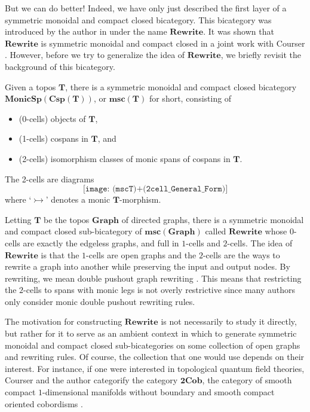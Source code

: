 \documentclass[11pt]{amsart}
\newcommand{\cat}[1]{\mathbf{#1}}
\newcommand{\bimonspcsp}[1]{\mathbf{MonicSp(Csp(#1))}}
\theoremstyle{remark}
\theoremstyle{definition}
\begin{document}
But we can do better! Indeed, we have only just described the first layer of a symmetric monoidal and compact closed bicategory. This bicategory was introduced by the author in \cite{Cic} under the name $\cat{Rewrite}$. It was shown that $\cat{Rewrite}$ is symmetric monoidal and compact closed in a joint work with Courser \cite{CicCours}. However, before we try to generalize the idea of $\cat{Rewrite}$, we briefly revisit the background of this bicategory. 

Given a topos $\cat{T}$, there is a symmetric monoidal and compact closed bicategory $\bimonspcsp{T}$, or $\cat{msc}(\cat{T})$ for short, consisting of 
\begin{itemize}
	\item (0-cells) objects of $\cat{T}$,
	\item (1-cells) cospans in $\cat{T}$, and
	\item (2-cells) isomorphism classes of monic spans of cospans in $\cat{T}$.
\end{itemize} 
The 2-cells are diagrams 
\[
	\texttt{[image: (mscT)+(2cell\_General\_Form)]}
\] 
where `$\rightarrowtail$' denotes a monic $\cat{T}$-morphism.  

Letting $\cat{T}$ be the topos $\cat{Graph}$ of directed graphs, there is a symmetric monoidal and compact closed sub-bicategory of $\cat{msc}(\cat{Graph})$ called $\cat{Rewrite}$ whose $0$-cells are exactly the edgeless graphs, and full in $1$-cells and $2$-cells. The idea of $\cat{Rewrite}$ is that the $1$-cells are open graphs and the $2$-cells are the ways to rewrite a graph into another while preserving the input and output nodes. By rewriting, we mean double pushout graph rewriting \cite{Corr_AlgAppGraphTrans}. This means that restricting the $2$-cells to spans with monic legs is not overly restrictive since many authors only consider monic double pushout rewriting rules.  

The motivation for constructing $\cat{Rewrite}$ is not necessarily to study it directly, but rather for it to serve as an ambient context in which to generate symmetric monoidal and compact closed sub-bicategories on some collection of open graphs and rewriting rules. Of course, the collection that one would use depends on their interest. For instance, if one were interested in topological quantum field theories, Courser and the author categorify the category $\cat{2Cob}$, the category of smooth compact $1$-dimensional manifolds without boundary and smooth compact oriented cobordisms \cite{CicCours}.
\end{document}

